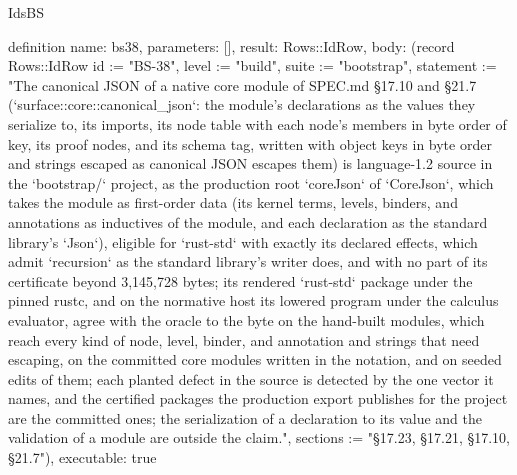 \begin{lexlean}{IdsBS}
\begin{semanticmodule}
definition{
  name: bs38,
  parameters: [],
  result: Rows::IdRow,
  body: (record Rows::IdRow {id := "BS-38", level := "build", suite := "bootstrap", statement := "The canonical JSON of a native core module of SPEC.md §17.10 and §21.7 (`surface::core::canonical_json`: the module's declarations as the values they serialize to, its imports, its node table with each node's members in byte order of key, its proof nodes, and its schema tag, written with object keys in byte order and strings escaped as canonical JSON escapes them) is language-1.2 source in the `bootstrap/` project, as the production root `coreJson` of `CoreJson`, which takes the module as first-order data (its kernel terms, levels, binders, and annotations as inductives of the module, and each declaration as the standard library's `Json`), eligible for `rust-std` with exactly its declared effects, which admit `recursion` as the standard library's writer does, and with no part of its certificate beyond 3,145,728 bytes; its rendered `rust-std` package under the pinned rustc, and on the normative host its lowered program under the calculus evaluator, agree with the oracle to the byte on the hand-built modules, which reach every kind of node, level, binder, and annotation and strings that need escaping, on the committed core modules written in the notation, and on seeded edits of them; each planted defect in the source is detected by the one vector it names, and the certified packages the production export publishes for the project are the committed ones; the serialization of a declaration to its value and the validation of a module are outside the claim.", sections := "§17.23, §17.21, §17.10, §21.7"}),
  executable: true
}


\end{semanticmodule}
\end{lexlean}
